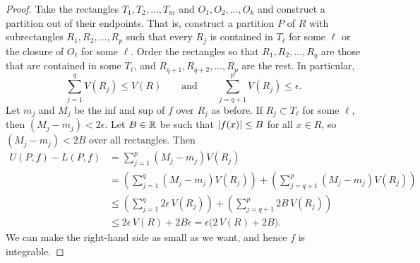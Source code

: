 \begin{proof}
Take the rectangles $T_1,T_2,\ldots,T_m$ and $O_1,O_2,\ldots,O_k$
and construct a partition out of their endpoints.  That is, construct
a partition $P$ of $R$ with subrectangles $R_1,R_2,\ldots,R_p$
such that every $R_j$ is contained in $T_\ell$ for some $\ell$
or the closure of $O_\ell$ for some $\ell$.  Order
the rectangles so that $R_1,R_2,\ldots,R_q$ are those
that are contained in some $T_\ell$, and $R_{q+1},R_{q+2},\ldots,R_{p}$
are the rest.
In particular,
\begin{equation*}
\sum_{j=1}^q V(R_j) \leq V(R)
\qquad \text{and} \qquad
\sum_{j=q+1}^p V(R_j) \leq \epsilon .
\end{equation*}
Let $m_j$ and $M_j$ be the inf and sup
of $f$
over $R_j$ as before.
If $R_j \subset T_\ell$ for some $\ell$, then $(M_j-m_j) < 2 \epsilon$.
Let $B \in {\mathbb{R}}$ be such that
$\lvert {f(x)} \rvert \leq B$ for all $x \in R$, so $(M_j-m_j) < 2B$ over all
rectangles. Then
\begin{equation*}
\begin{split}
U(P,f)-L(P,f)
& =
\sum_{j=1}^p (M_j-m_j) V(R_j)
\\
& =
\left(
\sum_{j=1}^q (M_j-m_j) V(R_j)
\right)
+
\left(
\sum_{j=q+1}^p (M_j-m_j) V(R_j)
\right)
\\
& \leq
\left(
\sum_{j=1}^q 2\epsilon\, V(R_j)
\right)
+
\left(
\sum_{j=q+1}^p 2 B\, V(R_j)
\right)
\\
& \leq
2 \epsilon\, V(R)
+
2B \epsilon = \epsilon \bigl(2\, V(R)+2B\bigr) .
\end{split}
\end{equation*}
We can make the right-hand side as small as we want,
and hence $f$ is integrable.

\medskip


\end{proof}
